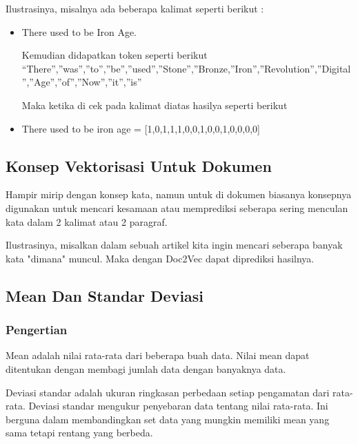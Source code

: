 Ilustrasinya, misalnya ada beberapa kalimat seperti berikut :
\begin{itemize}
\item There used to be Iron Age.

Kemudian didapatkan token seperti berikut “There”,”was”,”to”,”be”,”used”,”Stone”,”Bronze,”Iron”,”Revolution”,”Digital”,”Age”,”of”,”Now”,”it”,”is”

Maka ketika di cek pada kalimat diatas hasilya seperti berikut 
\item There used to be iron age = [1,0,1,1,1,0,0,1,0,0,1,0,0,0,0]
\end{itemize}

\subsection{Konsep Vektorisasi Untuk Dokumen}
Hampir mirip dengan konsep kata, namun untuk di dokumen biasanya konsepnya digunakan untuk mencari kesamaan atau memprediksi seberapa sering menculan kata dalam 2 kalimat atau 2 paragraf.

Ilustrasinya, misalkan dalam sebuah artikel kita ingin mencari seberapa banyak kata "dimana" muncul. Maka dengan Doc2Vec dapat diprediksi hasilnya.

\subsection{Mean Dan Standar Deviasi}
\subsubsection{Pengertian}
Mean adalah nilai rata-rata dari beberapa buah data. Nilai mean dapat ditentukan dengan membagi jumlah data dengan banyaknya data.

Deviasi standar adalah ukuran ringkasan perbedaan setiap pengamatan dari rata-rata. Deviasi standar mengukur penyebaran data tentang nilai rata-rata. Ini berguna dalam membandingkan set data yang mungkin memiliki mean yang sama tetapi rentang yang berbeda.


